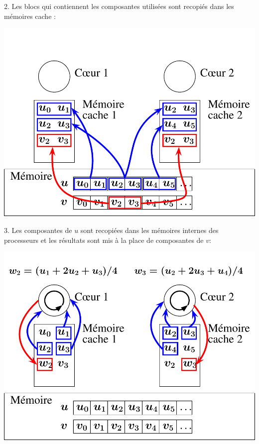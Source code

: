 \documentclass{beamer}
\begin{document}
\begin{frame}
	\parbox[t][1cm]{10cm}{2. Les blocs qui contiennent les composantes utilisées sont recopiés dans les mémoires cache :}
   \begin{center}
	\includegraphics[scale=0.6]{../../Images/multithread1}
   \end{center}
\end{frame}

\begin{frame}
	\parbox[t][1cm]{10cm}{3. Les composantes de $u$ sont recopiées dans les mémoires internes des processeurs et les résultats sont mis à la place de composantes de $v$:} 
	
   \begin{center}
	\includegraphics[scale=0.6]{../../Images/multithread2}
   \end{center}
\end{frame}
\end{document}
